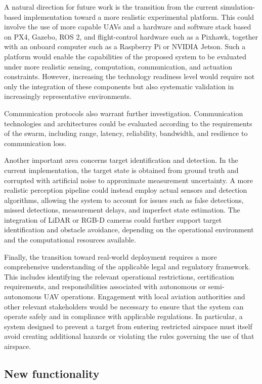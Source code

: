 A natural direction for future work is the transition from the current simulation-based implementation toward a more realistic experimental platform. This could involve the use of more capable UAVs and a hardware and software stack based on PX4, Gazebo, ROS 2, and flight-control hardware such as a Pixhawk, together with an onboard computer such as a Raspberry Pi or NVIDIA Jetson. Such a platform would enable the capabilities of the proposed system to be evaluated under more realistic sensing, computation, communication, and actuation constraints. However, increasing the technology readiness level would require not only the integration of these components but also systematic validation in increasingly representative environments.

Communication protocols also warrant further investigation. Communication technologies and architectures could be evaluated according to the requirements of the swarm, including range, latency, reliability, bandwidth, and resilience to communication loss.

Another important area concerns target identification and detection. In the current implementation, the target state is obtained from ground truth and corrupted with artificial noise to approximate measurement uncertainty. A more realistic perception pipeline could instead employ actual sensors and detection algorithms, allowing the system to account for issues such as false detections, missed detections, measurement delays, and imperfect state estimation. The integration of LiDAR or RGB-D cameras could further support target identification and obstacle avoidance, depending on the operational environment and the computational resources available.

Finally, the transition toward real-world deployment requires a more comprehensive understanding of the applicable legal and regulatory framework. This includes identifying the relevant operational restrictions, certification requirements, and responsibilities associated with autonomous or semi-autonomous UAV operations. Engagement with local aviation authorities and other relevant stakeholders would be necessary to ensure that the system can operate safely and in compliance with applicable regulations. In particular, a system designed to prevent a target from entering restricted airspace must itself avoid creating additional hazards or violating the rules governing the use of that airspace.

\subsection{New functionality}

